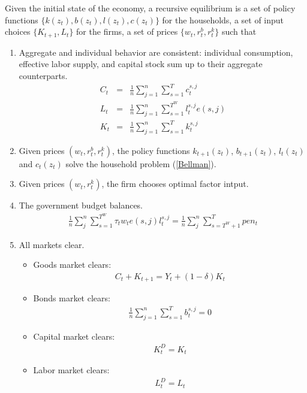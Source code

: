 \documentclass[12pt]{article}
\begin{document}
Given the initial state of the economy, a recursive equilibrium is a set of policy functions $\{k(z_t), b(z_t), l(z_t), c(z_t)\}$  for the households, a set of input choices $\{K_{t+1}, L_t\}$ for the firms, a set of prices $\{w_t,r_t^b,r_t^k\}$ such that 
\begin{enumerate}
	\item Aggregate and individual behavior are consistent: individual consumption, effective labor supply, and capital stock sum up to their aggregate counterparts. 
		\begin{eqnarray}
			C_t&=& \frac{1}{n}\sum_{j=1}^{n}\sum_{s=1}^{T}c_t^{s,j}\\
			L_t&=&\frac{1}{n} \sum_{j=1}^{n}\sum_{s=1}^{T^W}l_t^{s,j}e(s,j)\\
			K_t&=&\frac{1}{n} \sum_{j=1}^{n}\sum_{s=1}^{T}k_t^{s,j}
		\end{eqnarray}
	\item Given prices $(w_t,r_t^b,r_t^k)$, the policy functions $k_{t+1}(z_t)$, $b_{t+1}(z_t)$, $l_{t}(z_t)$ and $c_{t}(z_t)$ solve the household problem (\ref{Bellman}). 
	\item Given prices $(w_t,r_t^k)$, the firm chooses optimal factor intput.   
	\item The government budget balances.  
	\begin{eqnarray} \frac{1}{n}\sum_{j}^{n}\sum_{s=1}^{T^W}\tau_tw_te(s,j)l_{t}^{s,j} = \frac{1}{n} \sum_{j}^{n}\sum_{s=T^W+1}^{T}pen_t
	\end{eqnarray}
	\item All markets clear.
	\begin{itemize}
		\item Goods market clears:
			\begin{eqnarray}
			C_t+K_{t+1}=Y_t+(1-\delta)K_t
			\end{eqnarray}
		\item Bonds market clears:
			\begin{eqnarray}
			\frac{1}{n}\sum_{j=1}^{n}\sum_{s=1}^{T}b_t^{s,j} =0
			\end{eqnarray}
		\item Capital market clears:
			\begin{eqnarray}
			K_t^D=K_t
			\end{eqnarray}
		\item Labor market clears:
			\begin{eqnarray}
			L_t^D=L_t
			\end{eqnarray}
	\end{itemize}
\end{enumerate}
\end{document}

